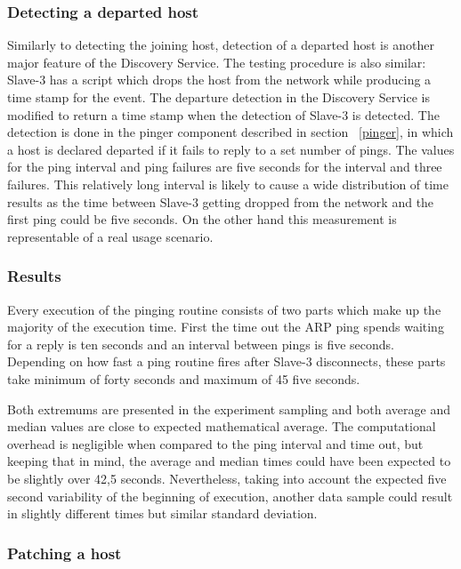 \subsubsection{Detecting a departed host}

Similarly to detecting the joining host, detection of a departed host is another major feature of the Discovery Service. The testing procedure is also similar: Slave-3 has a script which drops the host from the network while producing a time stamp for the event. The departure detection in the Discovery Service is modified to return a time stamp when the detection of Slave-3 is detected. The detection is done in the pinger component described in section ~\ref{pinger}, in which a host is declared departed if it fails to reply to a set number of pings. The values for the ping interval and ping failures are five seconds for the interval and three failures. This relatively long interval is likely to cause a wide distribution of time results as the time between Slave-3 getting dropped from the network and the first ping could be five seconds. On the other hand this measurement is representable of a real usage scenario. \newline 

\subsubsection*{Results}

Every execution of the pinging routine consists of two parts which make up the majority of the execution time. First the time out the ARP ping spends waiting for a reply is ten seconds and an interval between pings is five seconds. Depending on how fast a ping routine fires after Slave-3 disconnects, these parts take minimum of forty seconds and maximum of 45 five seconds.

Both extremums are presented in the experiment sampling and both average and median values are close to expected mathematical average. The computational overhead is negligible when compared to the ping interval and time out, but keeping that in mind, the average and median times could have been expected to be slightly over 42,5 seconds. 
Nevertheless, taking into account the expected five second variability of the beginning of execution, another data sample could result in slightly different times but similar standard deviation.

\subsubsection{Patching a host}

